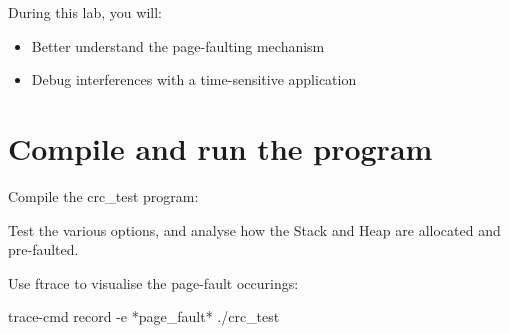 
During this lab, you will:
\begin{itemize}
  \item Better understand the page-faulting mechanism
  \item Debug interferences with a time-sensitive application
\end{itemize}

\section{Compile and run the program}

Compile the crc\_test program: 

Test the various options, and analyse how the Stack and Heap are allocated and
pre-faulted.

Use ftrace to visualise the page-fault occurings:
\begin{bashinput}
	trace-cmd record -e *page_fault* ./crc_test
\end{bashinput}

